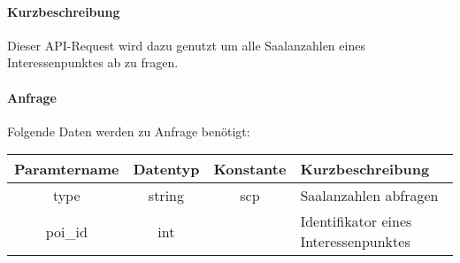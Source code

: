 \paragraph{Kurzbeschreibung}Dieser API-Request wird dazu genutzt um alle Saalanzahlen eines Interessenpunktes ab zu fragen.
\paragraph{Anfrage}Folgende Daten werden zu Anfrage benötigt:
\begin{table}[H]
	\begin{tabular}{|c|c|c|p{6.5cm}|}
		\hline
		\textbf{Paramtername} & \textbf{Datentyp} & \textbf{Konstante} & \textbf{Kurzbeschreibung}                                                                                               \\ \hline
		type                & string            & scp                & Saalanzahlen abfragen \\ \hline
		poi\_id             & int               &                    & Identifikator eines Interessenpunktes \\ \hline
	\end{tabular}
\end{table}
